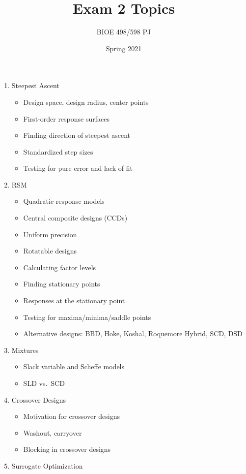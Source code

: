 \documentclass[pal,wide]{pajarticle}
\title{Exam 2 Topics}
\author{BIOE 498/598 PJ}
\date{Spring 2021}
\begin{document}
\maketitle

\newcommand\Vocab{\textbf{Vocab:}}

\begin{enumerate}
	\item Steepest Ascent
	\begin{itemize}
		\item Design space, design radius, center points
		\item First-order response surfaces
		\item Finding direction of steepest ascent
		\item Standardized step sizes
		\item Testing for pure error and lack of fit
	\end{itemize}
	\item RSM
	\begin{itemize}
		\item Quadratic response models
		\item Central composite designs (CCDs)
		\item Uniform precision
		\item Rotatable designs
		\item Calculating factor levels
		\item Finding stationary points
		\item Responses at the stationary point
		\item Testing for maxima/minima/saddle points
		\item Alternative designs: BBD, Hoke, Koshal, Roquemore Hybrid, SCD, DSD
	\end{itemize}
	\item Mixtures
	\begin{itemize}
		\item Slack variable and Scheffe models
		\item SLD vs.\ SCD
	\end{itemize}
	\item Crossover Designs
	\begin{itemize}
		\item Motivation for crossover designs
		\item Washout, carryover
		\item Blocking in crossover designs
	\end{itemize}
	\item Surrogate Optimization

\end{enumerate}
\end{document}
